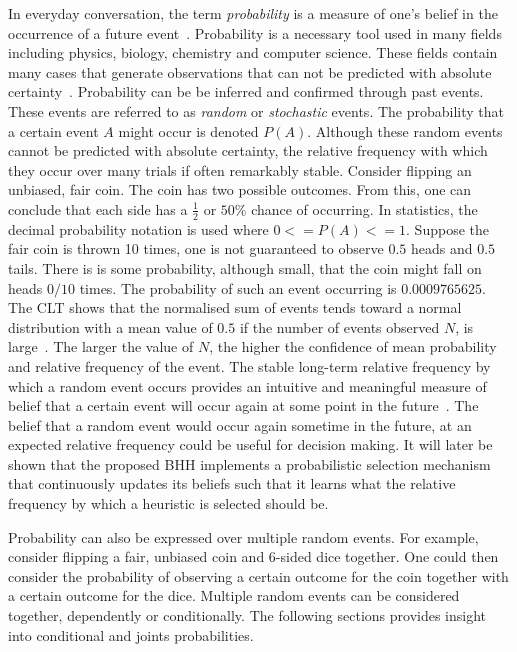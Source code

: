 In everyday conversation, the term \textit{probability} is a measure of one's belief in the occurrence of a future event~\cite{ref:wackerly:2014}. Probability is a necessary tool used in many fields including physics, biology, chemistry and computer science. These fields contain many cases that generate observations that can not be predicted with absolute certainty~\cite{ref:wackerly:2014}. Probability can be be inferred and confirmed through past events. These events are referred to as \textit{random} or \textit{stochastic} events. The probability that a certain event $A$ might occur is denoted $P(A)$. Although these random events cannot be predicted with absolute certainty, the relative frequency with which they occur over many trials if often remarkably stable. Consider flipping an unbiased, fair coin. The coin has two possible outcomes. From this, one can conclude that each side has a $\frac{1}{2}$ or $50\%$ chance of occurring. In statistics, the decimal probability notation is used where $0 <= P(A) <= 1$. Suppose the fair coin is thrown 10 times, one is not guaranteed to observe $0.5$ heads and $0.5$ tails. There is is some probability, although small, that the coin might fall on heads $0/10$ times. The probability of such an event occurring is $0.0009765625$. The \ac{CLT} shows that the normalised sum of events tends toward a normal distribution with a mean value of $0.5$ if the number of events observed $N$, is large~\cite{ref:wackerly:2014}. The larger the value of $N$, the higher the confidence of mean probability and relative frequency of the event. The stable long-term relative frequency by which a random event occurs provides an intuitive and meaningful measure of belief that a certain event will occur again at some point in the future~\cite{ref:wackerly:2014}. The belief that a random event would occur again sometime in the future, at an expected relative frequency could be useful for decision making. It will later be shown that the proposed \ac{BHH} implements a probabilistic selection mechanism that continuously updates its beliefs such that it learns what the relative frequency by which a heuristic is selected should be.

Probability can also be expressed over multiple random events. For example, consider flipping a fair, unbiased coin and 6-sided dice together. One could then consider the probability of observing a certain outcome for the coin together with a certain outcome for the dice. Multiple random events can be considered together, dependently or conditionally. The following sections provides insight into conditional and joints probabilities.

